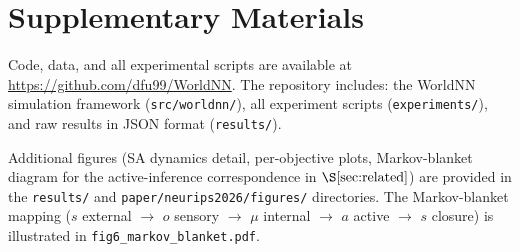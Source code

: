 \documentclass{article}
\begin{document}

\appendix
\section*{Supplementary Materials}

Code, data, and all experimental scripts are available at
\url{https://github.com/dfu99/WorldNN}. The repository includes:
the WorldNN simulation framework (\texttt{src/worldnn/}), all experiment
scripts (\texttt{experiments/}), and raw results in JSON format
(\texttt{results/}).

Additional figures (SA dynamics detail, per-objective plots,
Markov-blanket diagram for the active-inference correspondence
in $\S\ref{sec:related}$) are provided in the \texttt{results/} and
\texttt{paper/neurips2026/figures/} directories. The Markov-blanket
mapping ($s$ external $\to$ $o$ sensory $\to$ $\mu$ internal $\to$
$a$ active $\to$ $s$ closure) is illustrated in
\texttt{fig6\_markov\_blanket.pdf}.
\end{document}
